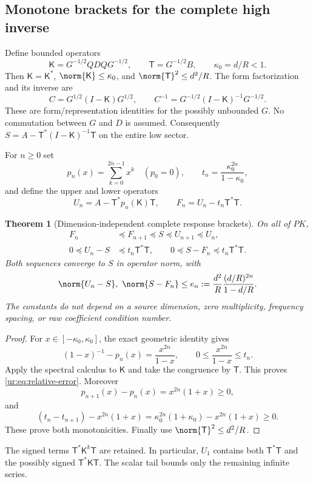 \documentclass[11pt,a4paper]{article}
\numberwithin{equation}{section}
\newtheorem{theorem}{Theorem}[section]
\theoremstyle{definition}\newtheorem{definition}[theorem]{Definition}
\theoremstyle{remark}\newtheorem{remark}[theorem]{Remark}
\begin{document}
\subsection{Monotone brackets for the complete high inverse}
Define bounded operators
\[
 {\mathsf K}=G^{-1/2}QDQG^{-1/2},\qquad
 {\mathsf T}=G^{-1/2}B,\qquad \kappa_0=d/R<1.
\]
Then ${\mathsf K}={\mathsf K}^*$, $\norm{{\mathsf K}}\le\kappa_0$, and
$\norm{{\mathsf T}}^2\le d^2/R$. The form factorization and its inverse are
\begin{equation}\label{ur:eq:factor}
 C=G^{1/2}(I-{\mathsf K})G^{1/2},\qquad
 C^{-1}=G^{-1/2}(I-{\mathsf K})^{-1}G^{-1/2}.
\end{equation}
These are form/representation identities for the possibly unbounded
$G$. No commutation between $G$ and $D$ is assumed.
Consequently $S=A-{\mathsf T}^*(I-{\mathsf K})^{-1}{\mathsf T}$ on the entire low sector.

For $n\ge0$ set
\[
 p_n(x)=\sum_{k=0}^{2n-1}x^k\quad(p_0=0),\qquad
 t_n=\frac{\kappa_0^{2n}}{1-\kappa_0},
\]
and define the upper and lower operators
\begin{equation}\label{ur:eq:brackets}
 U_n=A-{\mathsf T}^*p_n({\mathsf K}){\mathsf T},\qquad
 F_n=U_n-t_n{\mathsf T}^*{\mathsf T}.
\end{equation}

\begin{theorem}[Dimension-independent complete response brackets]\label{ur:thm:brackets}
On all of $PK$,
\begin{align}
 F_n&\preceq F_{n+1}\preceq S\preceq U_{n+1}\preceq U_n,\label{ur:eq:monotone}\\
 0\preceq U_n-S&\preceq t_n{\mathsf T}^*{\mathsf T},\qquad
 0\preceq S-F_n\preceq t_n{\mathsf T}^*{\mathsf T}.\label{ur:eq:relative-error}
\end{align}
Both sequences converge to $S$ in operator norm, with
\begin{equation}\label{ur:eq:absolute}
 \norm{U_n-S},\ \norm{S-F_n}
 \le e_n:=\frac{d^2}{R}\frac{(d/R)^{2n}}{1-d/R}.
\end{equation}
The constants do not depend on a source dimension, zero multiplicity,
frequency spacing, or raw coefficient condition number.
\end{theorem}
\begin{proof}
For $x\in[-\kappa_0,\kappa_0]$, the exact geometric identity gives
\[
 (1-x)^{-1}-p_n(x)=\frac{x^{2n}}{1-x},\qquad
 0\le\frac{x^{2n}}{1-x}\le t_n.
\]
Apply the spectral calculus to ${\mathsf K}$ and take the congruence by ${\mathsf T}$.
This proves \eqref{ur:eq:relative-error}. Moreover
\[
 p_{n+1}(x)-p_n(x)=x^{2n}(1+x)\ge0,
\]
and
\[
 (t_n-t_{n+1})-x^{2n}(1+x)
 =\kappa_0^{2n}(1+\kappa_0)-x^{2n}(1+x)\ge0.
\]
These prove both monotonicities. Finally use
$\norm{{\mathsf T}}^2\le d^2/R$.
\end{proof}
The signed terms ${\mathsf T}^*{\mathsf K}^k{\mathsf T}$ are retained. In particular, $U_1$
contains both ${\mathsf T}^*{\mathsf T}$ and the possibly signed ${\mathsf T}^*{\mathsf K}{\mathsf T}$.
The scalar tail bounds only the remaining infinite series.
\end{document}

